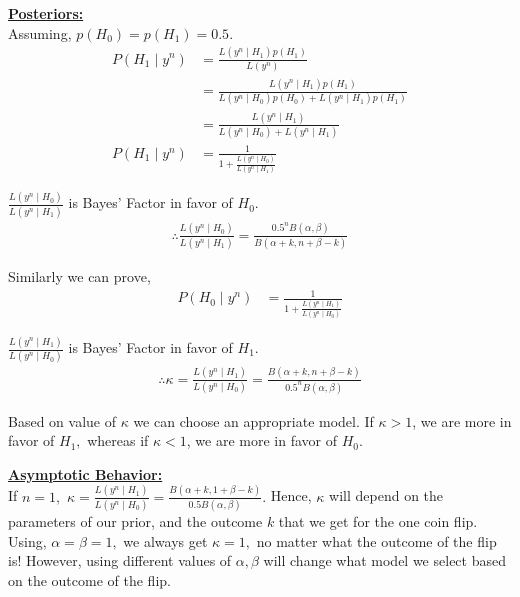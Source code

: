 \documentclass{article}
\begin{document}
\underline{\textbf{Posteriors:}}\\

Assuming, $p(H_0) = p(H_1) = 0.5.$\\
\begin{align*}
P(H_1 \mid y^n) &= \frac{L(y^n \mid H_1) p(H_1)}{L(y^n)}\\
&= \frac{L(y^n \mid H_1) p(H_1)}{L(y^n \mid H_0)p(H_0) + L(y^n \mid H_1)p(H_1)}\\
&= \frac{L(y^n \mid H_1)}{L(y^n \mid H_0) + L(y^n \mid H_1)}\\
P(H_1 \mid y^n) &= \frac{1}{1 + \frac{L(y^n \mid H_0)}{L(y^n \mid H_1)}}
\end{align*}

$\frac{L(y^n \mid H_0)}{L(y^n \mid H_1)}$ is Bayes' Factor in favor of $H_0.$\\
\begin{align*}
\therefore \frac{L(y^n \mid H_0)}{L(y^n \mid H_1)} = \frac{0.5^{n} B(\alpha,\beta)}{B(\alpha+k,n+\beta-k)}
\end{align*}

Similarly we can prove,
\begin{align*}
P(H_0 \mid y^n) &= \frac{1}{1 + \frac{L(y^n \mid H_1)}{L(y^n \mid H_0)}}
\end{align*}

$\frac{L(y^n \mid H_1)}{L(y^n \mid H_0)}$ is Bayes' Factor in favor of $H_1.$\\
\begin{align*}
\therefore \kappa = \frac{L(y^n \mid H_1)}{L(y^n \mid H_0)} = \frac{B(\alpha+k,n+\beta-k)}{0.5^{n}B(\alpha,\beta)}
\end{align*}

Based on value of $\kappa$ we can choose an appropriate model. If $\kappa > 1$, we are more in favor of $H_1,$ whereas if $\kappa < 1$, we are more in favor of $H_0.$\\

\pagebreak

\underline{\textbf{Asymptotic Behavior:}}\\

\indent If $n = 1,$ $\kappa = \frac{L(y^n \mid H_1)}{L(y^n \mid H_0)} = \frac{B(\alpha+k,1+\beta-k)}{0.5 B(\alpha,\beta)}.$ Hence, $\kappa$ will depend on the parameters of our prior, and the outcome $k$ that we get for the one coin flip. Using, $\alpha = \beta = 1,$ we always get $\kappa = 1,$ no matter what the outcome of the flip is! However, using different values of $\alpha,\beta$ will change what model we select based on the outcome of the flip.\\
\end{document}
